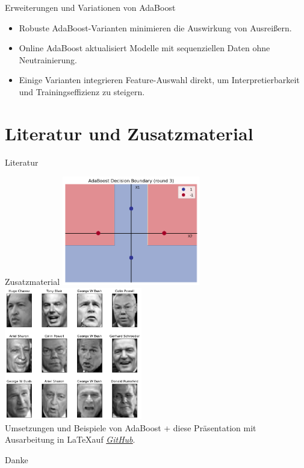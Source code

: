 \documentclass[hyperref={bookmarks=false},11pt,dvipsnames]{beamer}
\begin{document}
\begin{frame}{Erweiterungen und Variationen von AdaBoost}
	\begin{itemize}
		\item <1-> Robuste AdaBoost-Varianten minimieren die Auswirkung von Ausreißern.
		\item <2-> Online AdaBoost aktualisiert Modelle mit sequenziellen
		      Daten ohne Neutrainierung.
		\item <3-> Einige Varianten integrieren Feature-Auswahl direkt, um
		      Interpretierbarkeit und Trainingseffizienz zu steigern.
	\end{itemize}
\end{frame}
\section{Literatur und Zusatzmaterial}
\begin{frame}[allowframebreaks]{Literatur}
	
	
\end{frame}
\begin{frame}{Zusatzmaterial}
	\centering
	\includegraphics[width=0.45\textwidth]{../Code/img/XOR_Code.png}
	\includegraphics[width=0.45\textwidth]{../Code/img/face_recognition.png}\\
	Umsetzungen und Beispiele von AdaBoost + diese Präsentation mit Ausarbeitung
	in \LaTeX auf \textcolor{red}{\emph{\underline{\href{https://github.com/Vinfeno/TTAIDM_AdaBoost}{GitHub}}}}.
\end{frame}

\begin{frame}{Danke}
\end{frame}
\end{document}
